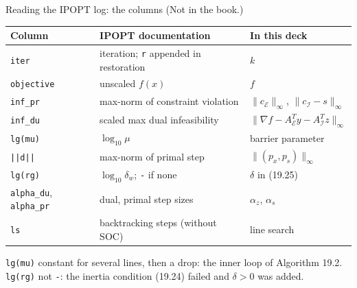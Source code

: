 \documentclass[aspectratio=169,12pt]{beamer}
\newcommand{\cE}{\mathcal{E}}
\newcommand{\cI}{\mathcal{I}}
\newcommand{\Ae}{A_{\cE}}
\newcommand{\Ai}{A_{\cI}}
\begin{document}
\begin{frame}{Reading the IPOPT log: the columns {\normalfont\small(Not in the book.)}}
  \begin{center}\small\setlength\tabcolsep{5pt}
  \renewcommand{\arraystretch}{1.12}
  \begin{tabular}{lll}
    \toprule
    Column & IPOPT documentation & In this deck \\
    \midrule
    \texttt{iter} & iteration; \texttt{r} appended in restoration & $k$ \\
    \texttt{objective} & unscaled $f(x)$ & $f$ \\
    \texttt{inf\_pr} & max-norm of constraint violation & $\|c_{\cE}\|_{\infty}$, $\|c_{\cI}-s\|_{\infty}$ \\
    \texttt{inf\_du} & scaled max dual infeasibility & $\|\nabla f-\Ae^{T}y-\Ai^{T}z\|_{\infty}$ \\
    \texttt{lg(mu)} & $\log_{10}\mu$ & barrier parameter \\
    \texttt{||d||} & max-norm of primal step & $\|(p_{x},p_{s})\|_{\infty}$ \\
    \texttt{lg(rg)} & $\log_{10}\delta_{w}$; \texttt{-} if none & $\delta$ in (19.25) \\
    \texttt{alpha\_du}, \texttt{alpha\_pr} & dual, primal step sizes & $\alpha_{z}$, $\alpha_{s}$ \\
    \texttt{ls} & backtracking steps (without SOC) & line search \\
    \bottomrule
  \end{tabular}
  \end{center}
  \texttt{lg(mu)} constant for several lines, then a drop: the inner loop of Algorithm 19.2.\\
  \texttt{lg(rg)} not \texttt{-}: the inertia condition (19.24) failed and $\delta>0$ was added.
\end{frame}
\end{document}
